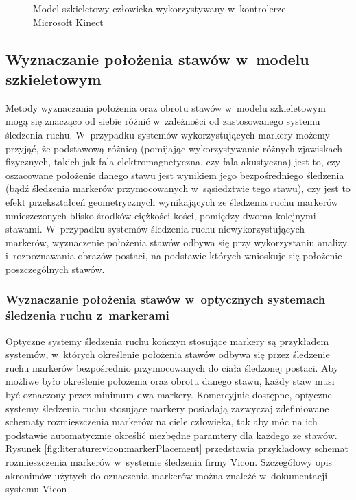 \begin{savenotes}
	\begin{figure}[!htb]	
		\centering
		\scalebox{0.73}{													
			
		}
		\caption[Model szkieletowy człowieka wykorzystywany w~kontrolerze Microsoft Kinect]{Model szkieletowy człowieka wykorzystywany w~kontrolerze Microsoft Kinect}
		\label{fig:characteristics:kinect:skeleton}
	\end{figure}
\end{savenotes}		
													
\subsection{Wyznaczanie położenia stawów w~modelu szkieletowym}
Metody wyznaczania położenia oraz obrotu stawów w~modelu szkieletowym mogą się znacząco od siebie różnić w~zależności od zastosowanego systemu śledzenia ruchu. W~przypadku systemów wykorzystujących markery możemy przyjąć, że podstawową różnicą (pomijając wykorzystywanie różnych zjawiskach fizycznych, takich jak fala elektromagnetyczna, czy fala akustyczna) jest to, czy oszacowane położenie danego stawu jest wynikiem jego bezpośredniego śledzenia (bądź śledzenia markerów przymocowanych w~sąsiedztwie tego stawu), czy jest to efekt przekształceń geometrycznych wynikających ze śledzenia ruchu markerów umieszczonych blisko środków ciężkości kości, pomiędzy dwoma kolejnymi stawami. W~przypadku systemów śledzenia ruchu niewykorzystujących markerów, wyznaczenie położenia stawów odbywa się przy wykorzystaniu analizy i~rozpoznawania obrazów postaci, na podstawie których wnioskuje się położenie poszczególnych stawów.
																	
\subsubsection*{Wyznaczanie położenia stawów w~optycznych systemach śledzenia ruchu z~markerami}
Optyczne systemy śledzenia ruchu kończyn stosujące markery są przykładem systemów, w~których określenie położenia stawów odbywa się przez śledzenie ruchu markerów bezpośrednio przymocowanych do ciała śledzonej postaci. Aby możliwe było określenie położenia oraz obrotu danego stawu, każdy staw musi być oznaczony przez minimum dwa markery. Komercyjnie dostępne, optyczne systemy śledzenia ruchu stosujące markery posiadają zazwyczaj zdefiniowane schematy rozmieszczenia markerów na ciele człowieka, tak aby móc na ich podstawie automatycznie określić niezbędne paramtery dla każdego ze stawów. Rysunek \ref{fig:literature:vicon:markerPlacement} przedstawia przykładowy schemat rozmieszczenia markerów w~systemie śledzenia firmy Vicon. Szczegółowy opis akronimów użytych do oznaczenia markerów można znaleźć w~dokumentacji systemu Vicon \cite{ViconGaitPlacement}.
																	
